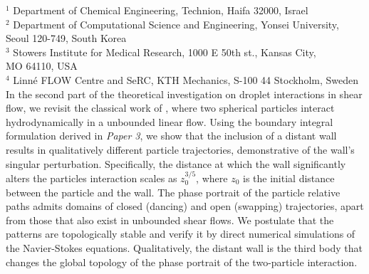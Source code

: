 %
%
%
%
%
%
%
\paperaffiliation
{%
  $^1$ Department of Chemical Engineering, Technion, Haifa 32000, Israel\\%
  $^2$ Department of Computational Science and Engineering, Yonsei University, \\Seoul 120-749, South Korea\\%
  $^3$ Stowers Institute for Medical Research, 1000 E 50th st., Kansas City, \\MO 64110, USA\\%
  $^4$ Linn\'e FLOW Centre and SeRC, KTH Mechanics, S-100 44 Stockholm, Sweden%
}%
%
%
%
\papervolume{}%
%
\papernumber{}
%
\paperpages{}%
%
\paperyear{}%
%
\papersummary%
{%
   In the second part of the theoretical investigation on droplet interactions in shear flow,
   we revisit the classical work of \cite{batchelor_green_1972}, where two spherical particles interact hydrodynamically in a unbounded linear flow.
   Using the boundary integral formulation derived in \emph{Paper 3},
   we show that the inclusion of a distant wall results in qualitatively different particle trajectories, demonstrative of the wall's singular perturbation.
   Specifically, the distance at which the wall significantly alters the particles interaction scales as $z_0^{3/5}$,
   where $z_0$ is the initial distance between the particle and the wall.
   The phase portrait of the particle relative paths admits domains of closed (dancing) and open (swapping) trajectories,
   apart from those that also exist in unbounded shear flows.
   We postulate that the patterns are topologically stable and verify it by direct numerical simulations of the Navier-Stokes equations.
   Qualitatively, the distant wall is the third body that changes the global topology of the phase portrait of the two-particle interaction.
}%
